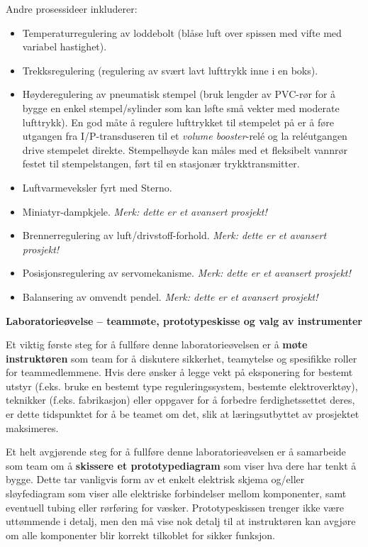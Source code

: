 \noindent
Andre prosessideer inkluderer:

\begin{itemize}
\item{} Temperaturregulering av loddebolt (blåse luft over spissen med vifte med variabel hastighet).
\vskip 10pt
\item{} Trekksregulering (regulering av svært lavt lufttrykk inne i en boks).
\vskip 10pt
\item{} Høyderegulering av pneumatisk stempel (bruk lengder av PVC-rør for å bygge en enkel stempel/sylinder som kan løfte små vekter med moderate lufttrykk). En god måte å regulere lufttrykket til stempelet på er å føre utgangen fra I/P-transduseren til et {\it volume booster}-relé og la reléutgangen drive stempelet direkte. Stempelhøyde kan måles med et fleksibelt vannrør festet til stempelstangen, ført til en stasjonær trykktransmitter.
\vskip 10pt
\item{} Luftvarmeveksler fyrt med Sterno.
\vskip 10pt
\item{} Miniatyr-dampkjele. {\it Merk: dette er et avansert prosjekt!}
\vskip 10pt
\item{} Brennerregulering av luft/drivstoff-forhold. {\it Merk: dette er et avansert prosjekt!}
\vskip 10pt
\item{} Posisjonsregulering av servomekanisme. {\it Merk: dette er et avansert prosjekt!}
\vskip 10pt
\item{} Balansering av omvendt pendel. {\it Merk: dette er et  avansert prosjekt!}
\end{itemize}





\vfil \eject

\noindent
{\bf Laboratorieøvelse -- teammøte, prototypeskisse og valg av instrumenter}

\vskip 5pt

Et viktig første steg for å fullføre denne laboratorieøvelsen er å {\bf møte instruktøren} som team for å diskutere sikkerhet, teamytelse og spesifikke roller for teammedlemmene. Hvis dere ønsker å legge vekt på eksponering for bestemt utstyr (f.eks. bruke en bestemt type reguleringssystem, bestemte elektroverktøy), teknikker (f.eks. fabrikasjon) eller oppgaver for å forbedre ferdighetssettet deres, er dette tidspunktet for å be teamet om det, slik at læringsutbyttet av prosjektet maksimeres.

\vskip 10pt

Et helt avgjørende steg for å fullføre denne laboratorieøvelsen er å samarbeide som team om å {\bf skissere et prototypediagram} som viser hva dere har tenkt å bygge. Dette tar vanligvis form av et enkelt elektrisk skjema og/eller sløyfediagram som viser alle elektriske forbindelser mellom komponenter, samt eventuell tubing eller rørføring for væsker. Prototypeskissen trenger ikke være uttømmende i detalj, men den må vise nok detalj til at instruktøren kan avgjøre om alle komponenter blir korrekt tilkoblet for sikker funksjon.

